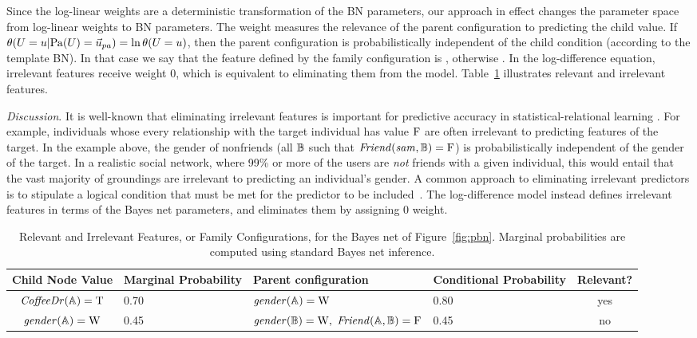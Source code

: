 \documentclass[twoside,11pt]{article}
\newcommand{\point}[1]{\noindent\emph{#1}.}
\begin{document}
Since the log-linear weights are a deterministic transformation of the BN parameters, our approach in effect changes the parameter space from log-linear weights to BN parameters.
The weight measures the relevance of the parent configuration to predicting the child value. If $\cprob{\UT = \UV}{\Pa{\UT} = \Prange{\UT}} = \ln \jprob{\UT = \UV}$, then the parent configuration is probabilistically independent of the child condition (according to the template BN). In that case we say that the feature defined by the family configuration is , otherwise . In the log-difference equation, irrelevant features receive weight 0, which is equivalent to eliminating them from the model. Table~\ref{table:relevance} illustrates relevant and irrelevant features.


\point{Discussion} It is well-known that eliminating irrelevant features is important for predictive accuracy in statistical-relational learning \cite{Getoor2007c,Ngo1997,Natarajan2008,Heckerman+al:SRL07}. For example, individuals whose every relationship with the target individual has value $\mathrm{F}$ are often irrelevant to predicting features of the target. In the example above, the gender of nonfriends (all $\mathbb{B}$ such that $\it{Friend}(sam, \mathbb{B}) = \mathrm{F}$) is probabilistically independent of the gender of the target. In a realistic social network, where 99\% or more of the users are {\em not} friends with a given individual, this would entail that the vast majority of groundings are irrelevant to predicting an individual's gender. A common approach to eliminating irrelevant predictors
is to stipulate a logical condition that must be met for the predictor to be included~\cite{Ngo1997,Natarajan2008,Russell2010,Getoor2006}. The log-difference model instead defines irrelevant features in terms of the Bayes net parameters, and eliminates them by assigning 0 weight.


\begin{table}
\vspace{-2cm}
\caption{Relevant and Irrelevant Features, or Family Configurations, for the Bayes net of Figure~\ref{fig:pbn}. Marginal probabilities are computed using standard Bayes net inference.}
\begin{center}
 \begin{tabular}{@{} |c p{2cm}|p{3.5cm} p{2cm}|c|@{}}
 \hline
Child Node Value & Marginal Probability & Parent configuration & Conditional Probability & Relevant? \\\hline
$\it{CoffeeDr}(\mathbb{A}) = \mathrm{T}$ & 0.70 & $\it{gender}(\mathbb{A}) = \mathrm{W}$ & 0.80 & yes \\
$\it{gender}(\mathbb{A}) = \mathrm{W}$ & 0.45 & $\it{gender}(\mathbb{B}) = \mathrm{W},$ $\it{Friend}(\mathbb{A},\mathbb{B}) = \mathrm{F}$ & 0.45 & no \\\hline
\end{tabular}
\end{center}
\label{table:relevance}
\end{table}%
\end{document}

